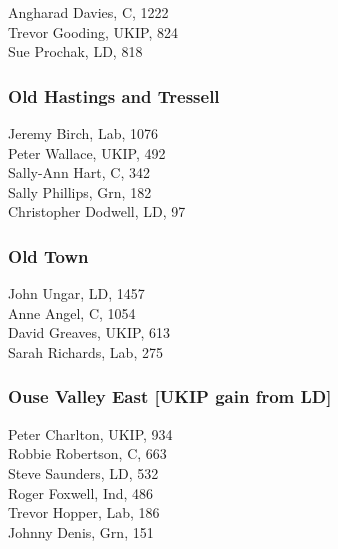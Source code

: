 \documentclass[a4paper,openany,10pt]{book}
\begin{document}


Angharad Davies, C, 1222\\
Trevor Gooding, UKIP, 824\\
Sue Prochak, LD, 818\\


\subsubsection*{Old Hastings and Tressell}



Jeremy Birch, Lab, 1076\\
Peter Wallace, UKIP, 492\\
Sally-Ann Hart, C, 342\\
Sally Phillips, Grn, 182\\
Christopher Dodwell, LD, 97\\


\subsubsection*{Old Town}



John Ungar, LD, 1457\\
Anne Angel, C, 1054\\
David Greaves, UKIP, 613\\
Sarah Richards, Lab, 275\\


\subsubsection*{Ouse Valley East \hspace*{\fill}\nolinebreak[1]%
\enspace\hspace*{\fill}
[UKIP gain from LD]}



Peter Charlton, UKIP, 934\\
Robbie Robertson, C, 663\\
Steve Saunders, LD, 532\\
Roger Foxwell, Ind, 486\\
Trevor Hopper, Lab, 186\\
Johnny Denis, Grn, 151\\
\end{document}
